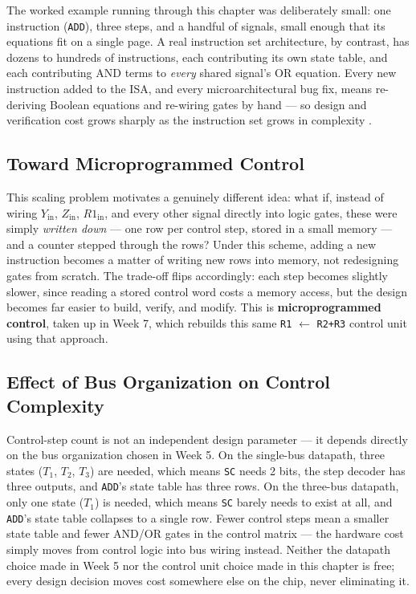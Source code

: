 \documentclass[11pt]{article}
\begin{document}
The worked example running through this chapter was deliberately small: one instruction (\texttt{ADD}), three steps, and a handful of signals, small enough that its equations fit on a single page. A real instruction set architecture, by contrast, has dozens to hundreds of instructions, each contributing its own state table, and each contributing AND terms to \emph{every} shared signal's OR equation. Every new instruction added to the ISA, and every microarchitectural bug fix, means re-deriving Boolean equations and re-wiring gates by hand --- so design and verification cost grows sharply as the instruction set grows in complexity \cite{Stallings2015_computer_organization}.

\subsection{Toward Microprogrammed Control}

This scaling problem motivates a genuinely different idea: what if, instead of wiring $Y_{\text{in}}$, $Z_{\text{in}}$, $R1_{\text{in}}$, and every other signal directly into logic gates, these were simply \emph{written down} --- one row per control step, stored in a small memory --- and a counter stepped through the rows? Under this scheme, adding a new instruction becomes a matter of writing new rows into memory, not redesigning gates from scratch. The trade-off flips accordingly: each step becomes slightly slower, since reading a stored control word costs a memory access, but the design becomes far easier to build, verify, and modify. This is \textbf{microprogrammed control}, taken up in Week 7, which rebuilds this same \texttt{R1} $\gets$ \texttt{R2+R3} control unit using that approach.

\subsection{Effect of Bus Organization on Control Complexity}

Control-step count is not an independent design parameter --- it depends directly on the bus organization chosen in Week 5. On the single-bus datapath, three states ($T_1$, $T_2$, $T_3$) are needed, which means \texttt{SC} needs 2 bits, the step decoder has three outputs, and \texttt{ADD}'s state table has three rows. On the three-bus datapath, only one state ($T_1$) is needed, which means \texttt{SC} barely needs to exist at all, and \texttt{ADD}'s state table collapses to a single row. Fewer control steps mean a smaller state table and fewer AND/OR gates in the control matrix --- the hardware cost simply moves from control logic into bus wiring instead. Neither the datapath choice made in Week 5 nor the control unit choice made in this chapter is free; every design decision moves cost somewhere else on the chip, never eliminating it.
\end{document}
